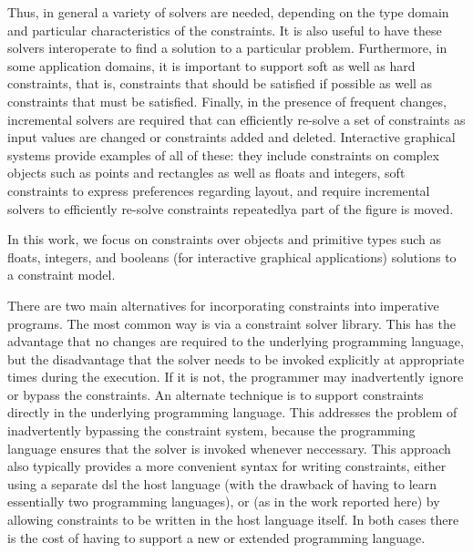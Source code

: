 Thus, in general a variety of solvers are
needed, depending on the type domain and particular characteristics of
the constraints.  It is also useful to have these solvers interoperate
to find a solution to a particular problem. Furthermore, in some
application domains, it is important to support soft as well as hard
constraints, that is, constraints that should be satisfied if possible
as well as constraints that must be satisfied. Finally, in the presence of
frequent changes, incremental solvers are required that can efficiently
re-solve a set of constraints as input values are changed or
constraints added and deleted.  Interactive graphical systems provide
examples of all of these: they include constraints on complex objects
such as points and rectangles as well as floats and integers, soft
constraints to express preferences regarding \DIFdelbegin {}\DIFdelend layout, and require
incremental solvers to efficiently re-solve constraints repeatedly\DIFdelbegin {}\DIFdelend \DIFaddbegin {}\DIFaddend a part of the figure is moved.

In this work, we focus on \DIFdelbegin {}\DIFdelend constraints over objects and primitive types
such as floats, integers, and booleans (\eg for interactive graphical
applications) \DIFdelbegin {}\DIFdelend \DIFaddbegin {}\DIFaddend solutions to a constraint model.

There are two main alternatives for incorporating constraints into
imperative programs. The most common way is via a constraint solver
library.  This has the advantage that no changes are required to the
underlying programming language, but \DIFdelbegin {}\DIFdelend the disadvantage that \DIFdelbegin {}\DIFdelend the solver
needs to be invoked explicitly at appropriate times during the
execution. If it is not, the programmer may inadvertently ignore or
bypass the constraints.  An alternate technique is to support
constraints directly in the underlying programming language.  This
addresses the problem of inadvertently bypassing the constraint
system, because the programming language ensures that the solver is
invoked whenever neccessary. This approach also typically provides a
more convenient syntax for writing constraints, either using a
separate \ac{dsl} \DIFdelbegin {}\DIFdelend \DIFaddbegin {}\DIFaddend the host language (with the
drawback of having to learn essentially two programming languages), or
(as in the work reported here) by allowing constraints to be written
in the host language itself.  In both cases there is the cost of
having to support a new or extended programming language.

